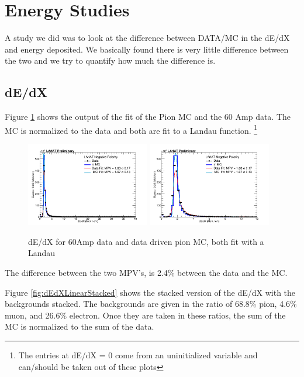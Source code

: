 \section{Energy Studies}

A study we did was to look at the difference between DATA/MC in the dE/dX and energy deposited. We basically found there is very little difference between the two and we try to quantify how much the difference is.

\subsection{dE/dX}
Figure \ref{fig:dEdXLinearScale} shows the output of the fit of the Pion MC and the 60 Amp data. The MC is normalized to the data and both are fit to a Landau function. \footnote{The entries at dE/dX = 0 come from an uninitialized variable and can/should be taken out of these plots}

\begin{figure}[htb]
\centering
\includegraphics[width=0.48\textwidth]{Studies/Figures/dEdX_Fit_v1.png}
\includegraphics[width=0.48\textwidth]{Studies/Figures/dEdX_Fit_v4.png}
\caption[]{ dE/dX for 60Amp data and data driven pion MC, both fit with a Landau  } \label{fig:dEdXLinearScale}
\end{figure}

The difference between the two MPV's, is 2.4\% between the data and the MC.

Figure \ref{fig:dEdXLinearStacked} shows the stacked version of the dE/dX with the backgrounds stacked. The backgrounds are given in the ratio of 68.8\% pion, 4.6\% muon, and 26.6\% electron. Once they are taken in these ratios, the sum of the MC is normalized to the sum of the data.

